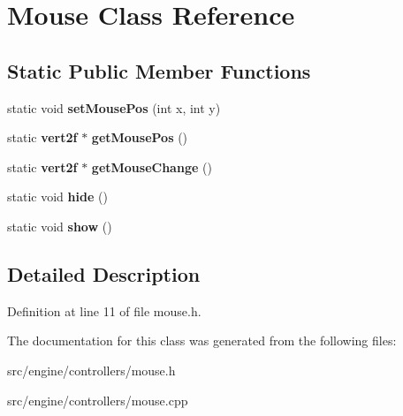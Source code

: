 \section{Mouse Class Reference}
\label{class_mouse}
\subsection*{Static Public Member Functions}
\begin{DoxyCompactItemize}
\item 
\mbox{\label{class_mouse_a8d3284b6f13f476fbbde922c5d6baf07}} 
static void {\bfseries set\+Mouse\+Pos} (int x, int y)
\item 
\mbox{\label{class_mouse_a6e60438b83b7b4190c98c9e72b8ae8cd}} 
static \textbf{ vert2f} $\ast$ {\bfseries get\+Mouse\+Pos} ()
\item 
\mbox{\label{class_mouse_a86e6a035e84791e868a4a3fc354e5885}} 
static \textbf{ vert2f} $\ast$ {\bfseries get\+Mouse\+Change} ()
\item 
\mbox{\label{class_mouse_a51cbcf499b9cf31ace1acf7945ca104d}} 
static void {\bfseries hide} ()
\item 
\mbox{\label{class_mouse_aa5db31c31460341b47081f4f742a382a}} 
static void {\bfseries show} ()
\end{DoxyCompactItemize}


\subsection{Detailed Description}


Definition at line 11 of file mouse.\+h.



The documentation for this class was generated from the following files\+:\begin{DoxyCompactItemize}
\item 
src/engine/controllers/mouse.\+h\item 
src/engine/controllers/mouse.\+cpp\end{DoxyCompactItemize}
